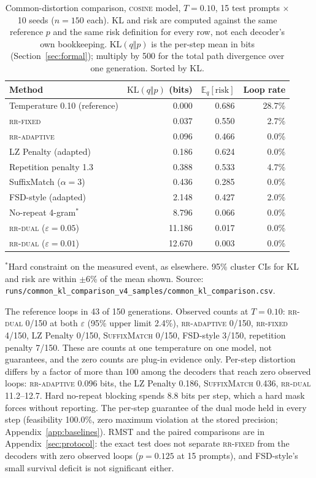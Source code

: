 \documentclass[11pt]{article}
\newcommand{\risk}{\mathrm{risk}}
\newcommand{\KL}{\mathrm{KL}}
\newcommand{\E}{\mathbb{E}}
\begin{document}
\begin{table}[ht]
\centering
\caption{Common-distortion comparison, \textsc{cosine} model, $T{=}0.10$, 15 test prompts $\times$ 10 seeds ($n{=}150$ each). KL and risk are computed against the same reference $p$ and the same risk definition for every row, not each decoder's own bookkeeping. $\KL(q\Vert p)$ is the per-step mean in bits (Section~\ref{sec:formal}); multiply by 500 for the total path divergence over one generation. Sorted by KL.}
\label{tab:commonkl}
\begin{tabular}{@{}lrrr@{}}
\toprule
Method & $\KL(q\Vert p)$ (bits) & $\E_q[\risk]$ & Loop rate \\
\midrule
Temperature 0.10 (reference) & 0.000 & 0.686 & 28.7\% \\
\textsc{rr-fixed} & 0.037 & 0.550 & 2.7\% \\
\textsc{rr-adaptive} & 0.096 & 0.466 & 0.0\% \\
LZ Penalty (adapted) & 0.186 & 0.624 & 0.0\% \\
Repetition penalty 1.3 & 0.388 & 0.533 & 4.7\% \\
SuffixMatch ($\alpha{=}3$) & 0.436 & 0.285 & 0.0\% \\
FSD-style (adapted) & 2.148 & 0.427 & 2.0\% \\
No-repeat 4-gram$^{*}$ & 8.796 & 0.066 & 0.0\% \\
\textsc{rr-dual} ($\varepsilon{=}0.05$) & 11.186 & 0.017 & 0.0\% \\
\textsc{rr-dual} ($\varepsilon{=}0.01$) & 12.670 & 0.003 & 0.0\% \\
\bottomrule
\end{tabular}

\vspace{4pt}
{\footnotesize $^{*}$Hard constraint on the measured event, as elsewhere. 95\% cluster CIs for KL and risk are within $\pm$6\% of the mean shown. Source: \texttt{runs/\allowbreak{}common\_\allowbreak{}kl\_\allowbreak{}comparison\_\allowbreak{}v4\_\allowbreak{}samples/\allowbreak{}common\_\allowbreak{}kl\_\allowbreak{}comparison.csv}.}
\end{table}

The reference loops in 43 of 150 generations. Observed counts at $T{=}0.10$: \textsc{rr-dual} 0/150 at both $\varepsilon$ (95\% upper limit 2.4\%), \textsc{rr-adaptive} 0/150, \textsc{rr-fixed} 4/150, LZ Penalty 0/150, \textsc{SuffixMatch} 0/150, FSD-style 3/150, repetition penalty 7/150. These are counts at one temperature on one model, not guarantees, and the zero counts are plug-in evidence only. Per-step distortion differs by a factor of more than 100 among the decoders that reach zero observed loops: \textsc{rr-adaptive} 0.096 bits, the LZ Penalty 0.186, \textsc{SuffixMatch} 0.436, \textsc{rr-dual} 11.2--12.7. Hard no-repeat blocking spends 8.8 bits per step, which a hard mask forces without reporting. The per-step guarantee of the dual mode held in every step (feasibility 100.0\%, zero maximum violation at the stored precision; Appendix~\ref{app:baselines}). RMST and the paired comparisons are in Appendix~\ref{sec:protocol}: the exact test does not separate \textsc{rr-fixed} from the decoders with zero observed loops ($p{=}0.125$ at 15 prompts), and FSD-style's small survival deficit is not significant either.
\end{document}
